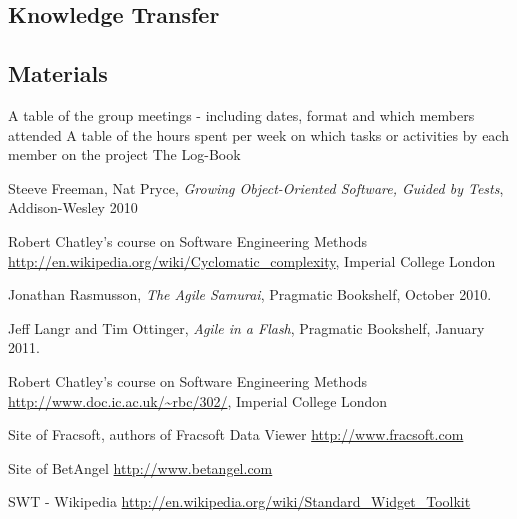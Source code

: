 \documentclass[10pt]{article}
\begin{document}
\subsection{Knowledge Transfer}



\subsection{Materials}

A table of the group meetings - including dates, format and which members attended
A table of the hours spent per week on which tasks or activities by each member on the project
The Log-Book

\begin{thebibliography}{9}
  Steeve Freeman, Nat Pryce,
  \emph{Growing Object-Oriented Software, Guided by Tests}, Addison-Wesley 2010

  Robert Chatley's course on Software Engineering Methods
  \url{http://en.wikipedia.org/wiki/Cyclomatic_complexity},
  Imperial College London

  Jonathan Rasmusson,
  \emph{The Agile Samurai},
  Pragmatic Bookshelf,
  October 2010.

  Jeff Langr and Tim Ottinger,
  \emph{Agile in a Flash},
  Pragmatic Bookshelf, 
  January 2011.

  Robert Chatley's course on Software Engineering Methods
  \url{http://www.doc.ic.ac.uk/~rbc/302/},
  Imperial College London

  Site of Fracsoft, authors of Fracsoft Data Viewer
  \url{http://www.fracsoft.com}

  Site of BetAngel
  \url{http://www.betangel.com}
  
  SWT - Wikipedia
  \url{http://en.wikipedia.org/wiki/Standard_Widget_Toolkit}

\end{thebibliography}
\end{document}
